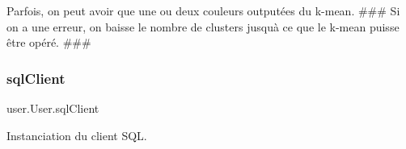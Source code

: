 Parfois, on peut avoir que une ou deux couleurs outputées du k-\/mean. \#\#\# Si on a une erreur, on baisse le nombre de clusters jusqu\textquotesingle{}à ce que le k-\/mean puisse être opéré. \#\#\# \mbox{\label{classuser_1_1_user_adf4a399faa3ea66427ecf7cb8a1bbb89}} 
\subsubsection{\texorpdfstring{sql\+Client}{sqlClient}}
{\footnotesize\ttfamily user.\+User.\+sql\+Client}



Instanciation du client S\+QL. 

\paragraph*{}
